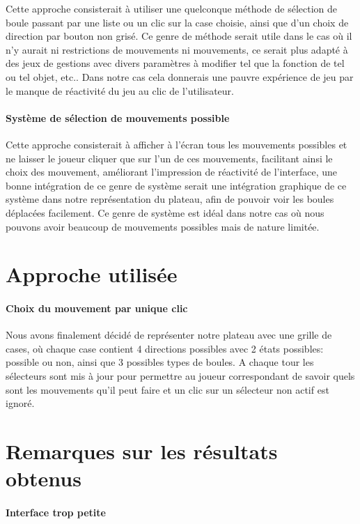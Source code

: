 \documentclass{scrreprt}
\begin{document}
			Cette approche consisterait à utiliser une quelconque méthode de sélection de boule passant par une liste ou un clic sur la case choisie, ainsi que d'un choix de direction par bouton non grisé. Ce genre de méthode serait utile dans le cas où il n'y aurait ni restrictions de mouvements ni mouvements, ce serait plus adapté à des jeux de gestions avec divers paramètres à modifier tel que la fonction de tel ou tel objet, etc.. Dans notre cas cela donnerais une pauvre expérience de jeu par le manque de réactivité du jeu au clic de l'utilisateur.
			
			\paragraph{Système de sélection de mouvements possible}
			
			Cette approche consisterait à afficher à l'écran tous les mouvements possibles et ne laisser le joueur cliquer que sur l'un de ces mouvements, facilitant ainsi le choix des mouvement, améliorant l'impression de réactivité de l'interface, une bonne intégration de ce genre de système serait une intégration graphique de ce système dans notre représentation du plateau, afin de pouvoir voir les boules déplacées facilement. Ce genre de système est idéal dans notre cas où nous pouvons avoir beaucoup de mouvements possibles mais de nature limitée.
				
		\section{Approche utilisée}
			\paragraph{Choix du mouvement par unique clic}
			
			Nous avons finalement décidé de représenter notre plateau avec une grille de cases, où chaque case contient 4 directions possibles avec 2 états possibles: possible ou non, ainsi que 3 possibles types de boules. A chaque tour les sélecteurs sont mis à jour pour permettre au joueur correspondant de savoir quels sont les mouvements qu'il peut faire et un clic sur un sélecteur non actif est ignoré.
			
			
		\section{Remarques sur les résultats obtenus}
			\paragraph{Interface trop petite}
			
\end{document}
